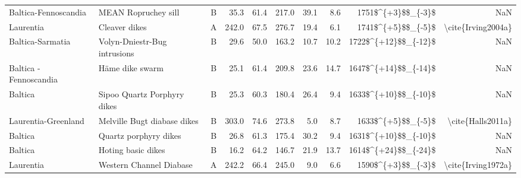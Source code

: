 \begin{longtable}{p{1 in}p{1 in}rrrrrrrr}
          Baltica-Fennoscandia &                                MEAN Ropruchey sill &      B &      35.3 &      61.4 & 217.0 &  39.1 &       8.6 &     1751\$\textasciicircum \{+3\}\$\$\_\{-3\}\$ &                                                NaN \\
                     Laurentia &                                      Cleaver dikes &      A &     242.0 &      67.5 & 276.7 &  19.4 &       6.1 &     1741\$\textasciicircum \{+5\}\$\$\_\{-5\}\$ &                                 \textbackslash cite\{Irving2004a\} \\
              Baltica-Sarmatia &                       Volyn-Dniestr-Bug intrusions &      B &      29.6 &      50.0 & 163.2 &  10.7 &      10.2 &   1722\$\textasciicircum \{+12\}\$\$\_\{-12\}\$ &                                                NaN \\
        Baltica - Fennoscandia &                                   Häme dike swarm  &      B &      25.1 &      61.4 & 209.8 &  23.6 &      14.7 &   1647\$\textasciicircum \{+14\}\$\$\_\{-14\}\$ &                                                NaN \\
                       Baltica &                        Sipoo Quartz Porphyry dikes &      B &      25.3 &      60.3 & 180.4 &  26.4 &       9.4 &   1633\$\textasciicircum \{+10\}\$\$\_\{-10\}\$ &                                                NaN \\
           Laurentia-Greenland &                        Melville Bugt diabase dikes &      B &     303.0 &      74.6 & 273.8 &   5.0 &       8.7 &     1633\$\textasciicircum \{+5\}\$\$\_\{-5\}\$ &                                  \textbackslash cite\{Halls2011a\} \\
                       Baltica &                              Quartz porphyry dikes &      B &      26.8 &      61.3 & 175.4 &  30.2 &       9.4 &   1631\$\textasciicircum \{+10\}\$\$\_\{-10\}\$ &                                                NaN \\
                       Baltica &                                 Hoting basic dikes &      B &      16.2 &      64.2 & 146.7 &  21.9 &      13.7 &   1614\$\textasciicircum \{+24\}\$\$\_\{-24\}\$ &                                                NaN \\
                     Laurentia &                            Western Channel Diabase &      A &     242.2 &      66.4 & 245.0 &   9.0 &       6.6 &     1590\$\textasciicircum \{+3\}\$\$\_\{-3\}\$ &                                 \textbackslash cite\{Irving1972a\} \\

\end{longtable}
